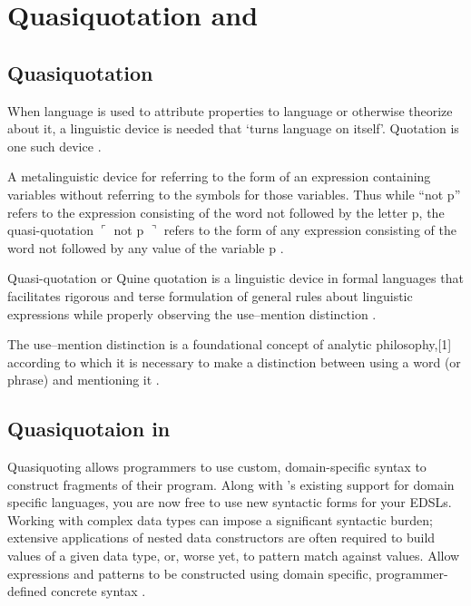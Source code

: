\documentclass[proposal.tex]{subfiles}
\begin{document}

\section{Quasiquotation and }
\subsection{Quasiquotation}

When language is used to attribute properties to language or otherwise theorize about it, a linguistic device is needed that `turns 
language on itself'. Quotation is one such device \cite{website:quotationstanford}.

A metalinguistic device for referring to the form of an expression containing variables without referring to the symbols for those 
variables. Thus while ``not p'' refers to the expression consisting of the word not followed by the letter p, the quasi-quotation \newline
$\ulcorner$ not p $\urcorner$ refers to the form of any expression consisting of the word not followed by any value of the variable p 
\cite{website:quasiquotationfreedictionary}.

Quasi-quotation or Quine quotation is a linguistic device in formal languages that facilitates rigorous and terse formulation of general 
rules about linguistic expressions while properly observing the use--mention distinction \cite{wikiquasi}.

The use--mention distinction is a foundational concept of analytic philosophy,[1] according to which it is necessary to make a distinction 
between using a word (or phrase) and mentioning it \cite{website:usementiondistinctionwiki}.


\subsection{Quasiquotaion in }

Quasiquoting allows programmers to use custom, domain-specific syntax to construct fragments of their program. Along with 
's existing support for domain specific languages, you are now free to use new syntactic forms for your EDSLs. Working 
with complex data types can impose a significant syntactic burden; extensive applications of nested data constructors are often required to 
build values of a given data type, or, worse yet, to pattern match against values. Allow  expressions and patterns to be 
constructed using domain specific, programmer-defined concrete syntax \cite{haskellquasi, mainland2007s}.
\end{document}
